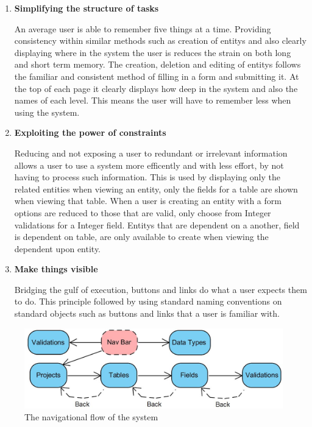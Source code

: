\documentclass[a4paper,12pt]{article}
\begin{document}
\begin{enumerate}
\item \textbf{Simplifying the structure of tasks}
\par An average user is able to remember five things at a time. Providing consistency within similar methods such as creation of entitys and also clearly displaying where in the system the user is reduces the strain on both long and short term memory. The creation, deletion and editing of entitys follows the familiar and consistent method of filling in a form and submitting it. At the top of each page it clearly displays how deep in the system and also the names of each level. This means the user will have to remember less when using the system.
\item \textbf{Exploiting the power of constraints}
\par Reducing and not exposing a user to redundant or irrelevant information allows a user to use a system more efficently and with less effort, by not having to process such information. This is used by displaying only the related entities when viewing an entity, only the fields for a table are shown when viewing that table. When a user is creating an entity with a form options are reduced to those that are valid, only choose from Integer validations for a Integer field. Entitys that are dependent on a another, field is dependent on table, are only available to create when viewing the dependent upon entity.
\item \textbf{Make things visible}
\par Bridging the gulf of execution, buttons and links do what a user expects them to do.  This principle followed by using standard naming conventions on standard objects such as buttons and links that a user is familiar with.
\end{enumerate}

\begin{figure}
\includegraphics[width=\linewidth]{screenshots/pageflow}
\caption{The navigational flow of the system}
\label{fig:nflow}
\end{figure}
\end{document}

